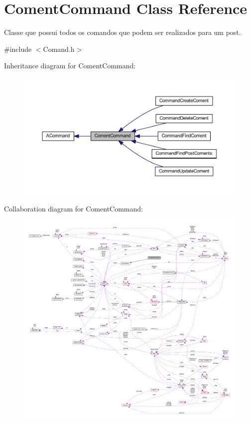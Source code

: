 \hypertarget{class_coment_command}{\section{Coment\-Command Class Reference}
\label{class_coment_command}
}


Classe que possui todos os comandos que podem ser realizados para um post.  




{\ttfamily \#include $<$Comand.\-h$>$}



Inheritance diagram for Coment\-Command\-:\nopagebreak
\begin{figure}[H]
\begin{center}
\leavevmode
\includegraphics[width=350pt]{class_coment_command__inherit__graph}
\end{center}
\end{figure}


Collaboration diagram for Coment\-Command\-:\nopagebreak
\begin{figure}[H]
\begin{center}
\leavevmode
\includegraphics[width=350pt]{class_coment_command__coll__graph}
\end{center}
\end{figure}

